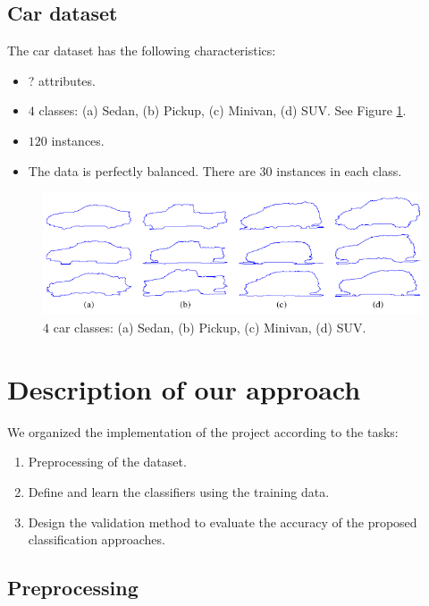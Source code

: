 \documentclass{article} %
\begin{document}
\subsection{Car dataset}
The car dataset has the following characteristics:
\begin{itemize}
    \item ? attributes.
    \item $4$ classes: (a) Sedan, (b) Pickup, (c) Minivan, (d) SUV. See Figure \ref{fig:car}.
    \item $120$ instances. 
    \item The data is perfectly balanced. There are 30 instances in each class.
\end{itemize}

\begin{figure}[ht]
    \centering
    \includegraphics[width=\linewidth]{shape_car.png}
    \caption{$4$ car classes: (a) Sedan, (b) Pickup, (c) Minivan, (d) SUV.}
    \label{fig:car}
\end{figure}

\section{Description of our approach}
  
 We organized the implementation of the project according to the tasks:

\begin{enumerate} 

 \item Preprocessing of the dataset.

 \item Define and learn the classifiers using the training data.

 \item  Design the validation method to evaluate the accuracy of the proposed classification approaches.  
\end{enumerate} 


\subsection{Preprocessing}
\end{document}
